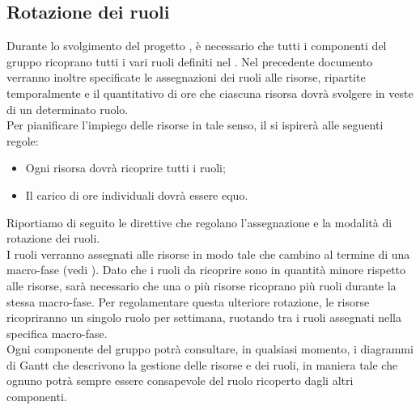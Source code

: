 \subsection{Rotazione dei ruoli}
\label{rotazioneruoli}
Durante lo svolgimento del progetto \project{}, è necessario che tutti i componenti del gruppo ricoprano tutti i vari ruoli definiti nel \PdP{}. Nel precedente documento verranno inoltre specificate le assegnazioni dei ruoli alle risorse, ripartite temporalmente e il quantitativo di ore che ciascuna risorsa dovrà svolgere in veste di un determinato ruolo.\\
Per pianificare l'impiego delle risorse in tale senso, il \projectManager{} si ispirerà alle seguenti regole:
\begin{itemize}
	\item Ogni risorsa dovrà ricoprire tutti i ruoli;
	\item Il carico di ore individuali dovrà essere equo.
\end{itemize}
Riportiamo di seguito le direttive che regolano l'assegnazione e la modalità di rotazione dei ruoli.\\
I ruoli verranno assegnati alle risorse in modo tale che cambino al termine di una macro-fase (vedi \PdP). Dato che i ruoli da ricoprire sono in quantità minore rispetto alle risorse, sarà necessario che una o più risorse ricoprano più ruoli durante la stessa macro-fase. Per regolamentare questa ulteriore rotazione, le risorse ricopriranno un singolo ruolo per settimana, ruotando tra i ruoli assegnati nella specifica macro-fase.\\
Ogni componente del gruppo potrà consultare, in qualsiasi momento, i diagrammi di Gantt\glossario{} che descrivono la gestione delle risorse e dei ruoli, in maniera tale che ognuno potrà sempre essere consapevole del ruolo ricoperto dagli altri componenti.